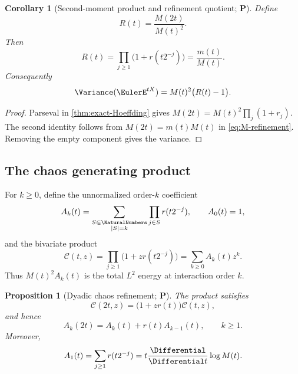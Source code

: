 \documentclass[11pt,oneside]{article}
\newtheorem{proposition}[theorem]{Proposition}
\newtheorem{corollary}[theorem]{Corollary}
\theoremstyle{definition}
\theoremstyle{remark}
\newcommand{\Ccal}{\mathcal C}
\newcommand{\statusP}{\textcolor{deepgreen}{\textbf{P}}}
\begin{document}
\begin{corollary}[Second-moment product and refinement quotient; \statusP]
\label{cor:R-product}
Define
\begin{equation}
 R(t)=\frac{M(2t)}{M(t)^2}.
 \label{eq:R-def}
\end{equation}
Then
\begin{equation}
 \boxed{
 R(t)=\prod_{j\ge1}\bigl(1+r(t2^{-j})\bigr)
 =\frac{m(t)}{M(t)}.}
 \label{eq:R-two-forms}
\end{equation}
Consequently
\begin{equation}
 \Variance(\EulerE^{tX})=M(t)^2\bigl(R(t)-1\bigr).
 \label{eq:exp-variance}
\end{equation}
\end{corollary}

\begin{proof}
Parseval in \cref{thm:exact-Hoeffding} gives
$M(2t)=M(t)^2\prod_j(1+r_j)$.  The second identity follows from
$M(2t)=m(t)M(t)$ in \eqref{eq:M-refinement}.  Removing the empty component gives
the variance.
\end{proof}

\subsection{The chaos generating product}

For $k\ge0$, define the unnormalized order-$k$ coefficient
\begin{equation}
 A_k(t)=\sum_{\substack{S\Subset\NaturalNumbers\\|S|=k}}
            \prod_{j\in S}r(t2^{-j}),
 \qquad A_0(t)=1,
 \label{eq:A-k-def}
\end{equation}
and the bivariate product
\begin{equation}
 \Ccal(t,z)=\prod_{j\ge1}\bigl(1+zr(t2^{-j})\bigr)
           =\sum_{k\ge0}A_k(t)z^k.
 \label{eq:chaos-product}
\end{equation}
Thus $M(t)^2A_k(t)$ is the total $L^2$ energy at interaction order $k$.

\begin{proposition}[Dyadic chaos refinement; \statusP]
\label{prop:chaos-refinement}
The product satisfies
\begin{equation}
 \boxed{\Ccal(2t,z)=\bigl(1+zr(t)\bigr)\Ccal(t,z),}
 \label{eq:C-refinement}
\end{equation}
and hence
\begin{equation}
 A_k(2t)=A_k(t)+r(t)A_{k-1}(t),
 \qquad k\ge1.
 \label{eq:A-refinement}
\end{equation}
Moreover,
\begin{equation}
 A_1(t)=\sum_{j\ge1}r(t2^{-j})
       =t\frac{\Differential}{\Differential t}\log M(t).
 \label{eq:A1-logM}
\end{equation}
\end{proposition}
\end{document}
